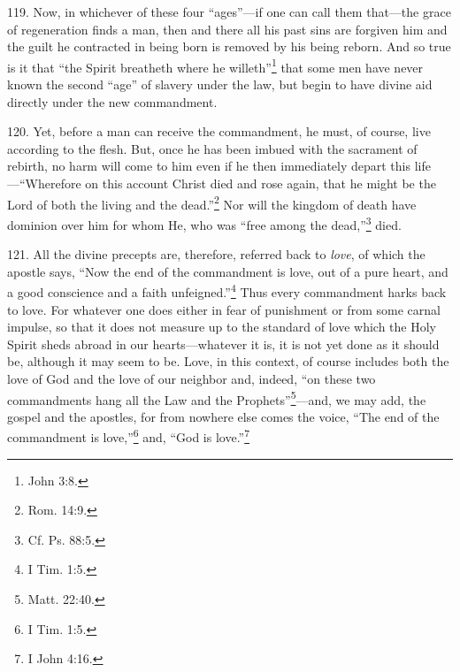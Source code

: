 119. Now, in whichever of these four ``ages''—if one can call them that—the grace of regeneration finds a man, then and there all his past sins are forgiven him and the guilt he contracted in being born is removed by his being reborn. And so true is it that ``the Spirit breatheth where he willeth''\footnote{John 3:8.} that some men have never known the second ``age'' of slavery under the law, but begin to have divine aid directly under the new commandment.

120. Yet, before a man can receive the commandment, he must, of course, live according to the flesh. But, once he has been imbued with the sacrament of rebirth, no harm will come to him even if he then immediately depart this life—``Wherefore on this account Christ died and rose again, that he might be the Lord of both the living and the dead.''\footnote{Rom. 14:9.} Nor will the kingdom of death have dominion over him for whom He, who was ``free among the dead,''\footnote{Cf. Ps. 88:5.} died.


121. All the divine precepts are, therefore, referred back to \emph{love}, of which the apostle says, ``Now the end of the commandment is love, out of a pure heart, and a good conscience and a faith unfeigned.''\footnote{I Tim. 1:5.} Thus every commandment harks back to love. For whatever one does either in fear of punishment or from some carnal impulse, so that it does not measure up to the standard of love which the Holy Spirit sheds abroad in our hearts—whatever it is, it is not yet done as it should be, although it may seem to be. Love, in this context, of course includes both the love of God and the love of our neighbor and, indeed, ``on these two commandments hang all the Law and the Prophets''\footnote{Matt. 22:40.}—and, we may add, the gospel and the apostles, for from nowhere else comes the voice, ``The end of the commandment is love,''\footnote{I Tim. 1:5.} and, ``God is love.''\footnote{I John 4:16.}

